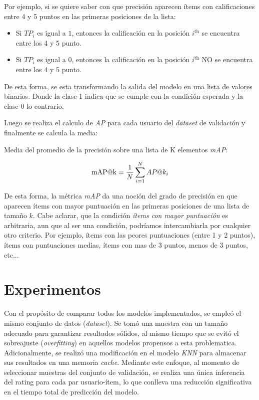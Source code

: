 \documentclass[11pt,a4paper,twoside]{thesis}
\begin{document}
Por ejemplo, si se quiere saber con que precisión aparecen ítems con
calificaciones entre 4 y 5 puntos en las primeras posiciones de la lista:

\begin{itemize}
	\item Si $TP_i$ es igual a $1$, entonces la calificación en la posición
	      $i^\mathrm{th}$ se encuentra entre los 4 y 5 punto.
	\item Si $TP_i$ es igual a $0$, entonces la calificación en la posición
	      $i^\mathrm{th}$ NO se encuentra entre los 4 y 5 punto.
\end{itemize}

De esta forma, se esta transformando la salida del modelo en una lista de
valores binarios. Donde la clase 1 indica que se cumple con la condición
esperada y la clase 0 lo contrario.

Luego se realiza el calculo de \textit{AP\makeatletter@k} para cada usuario del
\textit{dataset} de validación y finalmente se calcula la media:

\begin{description}
	\item[Media del promedio de la precisión sobre una lista de K elementos
	\textit{mAP\makeatletter@k}:]
\end{description}
\begin{equation}
	\operatorname{mAP\makeatletter@k}=\frac{1}{N} \sum_{i=1}^N AP\makeatletter@k_i
\end{equation}

De esta forma, la métrica \textit{mAP\makeatletter@k} da una noción del grado
de precisión en que aparecen ítems con mayor puntuación en las primeras
posiciones de una lista de tamaño $k$. Cabe aclarar, que la condición
\textit{ítems con mayor puntuación} es arbitraria, aun que al ser una
condición, podríamos intercambiarla por cualquier otro criterio. Por ejemplo,
ítems con las peores puntuaciones (entre 1 y 2 puntos), ítems con puntuaciones
medias, ítems con mas de 3 puntos, menos de 3 puntos, etc...

\chapter{Experimentos}

Con el propósito de comparar todos los modelos implementados, se empleó el
mismo conjunto de datos (\textit{dataset}). Se tomó una muestra con un tamaño
adecuado para garantizar resultados sólidos, al mismo tiempo que se evitó el
sobreajuste (\textit{overfitting}) en aquellos modelos propensos a esta
problematica. Adicionalmente, se realizó una modificación en el modelo
\textit{KNN} para almacenar sus resultados en una memoria \textit{cache}.
Mediante este enfoque, al momento de seleccionar muestras del conjunto de
validación, se realiza una única inferencia del rating para cada par
usuario-ítem, lo que conlleva una reducción significativa en el tiempo total de
predicción del modelo.
\end{document}
